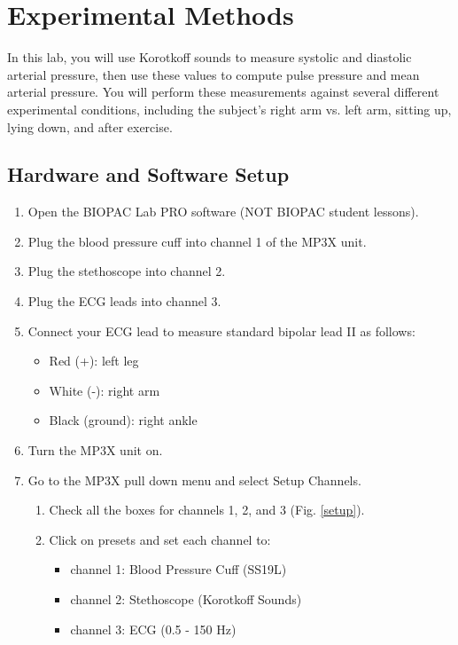 \documentclass{article}
\begin{document}
\section*{Experimental Methods}
In this lab, you will use Korotkoff sounds to measure systolic and diastolic arterial pressure, then use these values to compute pulse pressure and mean arterial pressure. You will perform these measurements against several different experimental conditions, including the subject's right arm vs. left arm, sitting up, lying down, and after exercise.

\subsection*{Hardware and Software Setup}
\begin{enumerate}
	\item 
	
	Open the BIOPAC Lab PRO software (NOT BIOPAC student lessons).
	\item Plug the blood pressure cuff into channel 1 of the MP3X unit.
	\item Plug the stethoscope into channel 2.
	\item Plug the ECG leads into channel 3.
	\item Connect your ECG lead to measure standard bipolar lead II as follows:\begin{itemize}
		\item Red (+): left leg
		\item White (-): right arm
		\item Black (ground): right ankle
	\end{itemize}
	\item Turn the MP3X unit on.
	\item Go to the MP3X pull down menu and select Setup Channels.
	\begin{enumerate}
		\item Check all the boxes for channels 1, 2, and 3 (Fig. \ref{setup}).
		\item Click on presets and set each channel to:\begin{itemize}
			\item channel 1: Blood Pressure Cuff (SS19L)
			\item channel 2: Stethoscope (Korotkoff Sounds)
			\item channel 3: ECG (0.5 - 150 Hz)
		\end{itemize}
	\end{enumerate}
\end{enumerate}
\end{document}
